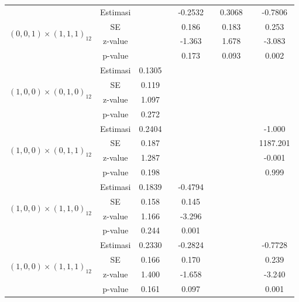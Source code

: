 \begin{enumerate}[label=\alph*.]
\begin{longtable}{|c|c|c|c|c|c|c|c|c|}
            \multirow{4}{*}{$(0,0,1)\times(1,1,1)_{12}$}
            & Estimasi & {} & {} & -0.2532 & {} & 0.3068 & {} & -0.7806 \\ \cline{2-9}
            & SE       & {} & {} & 0.186   & {} & 0.183 & {} & 0.253\\ \cline{2-9}
            & z-value  & {} & {} & -1.363  & {} & 1.678 & {} & -3.083\\ \cline{2-9}
            & p-value  & {} & {} & 0.173  & {} & 0.093 & {} & 0.002\\ \hline

            \multirow{4}{*}{$(1,0,0)\times(0,1,0)_{12}$}
            & Estimasi & 0.1305  & {} & {} & {} & {} & {} & {} \\ \cline{2-9}
            & SE       & 0.119 & {} & {} & {} & {} & {} & {} \\ \cline{2-9}
            & z-value  & 1.097   & {} & {} & {} & {} & {} & {}\\ \cline{2-9}
            & p-value  & 0.272 & {} & {} & {} & {} & {} & {}\\ \hline

            \multirow{4}{*}{$(1,0,0)\times(0,1,1)_{12}$}
            & Estimasi & 0.2404  & {} & {} & {} & {} & {} & -1.000 \\ \cline{2-9}
            & SE       & 0.187  & {} & {} & {} & {} & {} & 1187.201\\ \cline{2-9}
            & z-value  & 1.287   & {} & {} & {} & {} & {} & -0.001\\ \cline{2-9}
            & p-value  & 0.198 & {} & {} & {} & {} & {} & 0.999\\ \hline

            \multirow{4}{*}{$(1,0,0)\times(1,1,0)_{12}$}
            & Estimasi & 0.1839  & {} & -0.4794 & {} & {} & {} & {}\\ \cline{2-9}
            & SE       & 0.158  & {} & 0.145 & {} & {} & {} & {}\\ \cline{2-9}
            & z-value  & 1.166   & {} & -3.296& {} & {} & {}& {}\\ \cline{2-9}
            & p-value  & 0.244 & {} & 0.001 & {} & {} & {} & {}\\ \hline

            \multirow{4}{*}{$(1,0,0)\times(1,1,1)_{12}$}
            & Estimasi & 0.2330  & {} & -0.2824 & {} & {} & {} & -0.7728 \\ \cline{2-9}
            & SE       & 0.166    & {} & 0.170 & {} & {} & {} & 0.239\\ \cline{2-9}
            & z-value  & 1.400   & {} & -1.658 & {} & {} & {} & -3.240\\ \cline{2-9}
            & p-value  & 0.161    & {} &  0.097 & {} & {} & {} & 0.001\\ \hline


\end{longtable}
\end{enumerate}
